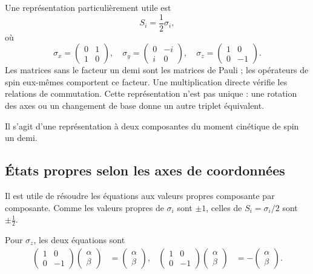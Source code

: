 Une représentation particulièrement utile est
\begin{equation}
S_i=\frac12\sigma_i,
\end{equation}
où
\begin{equation}
\sigma_x=
\begin{pmatrix}
0&1\\
1&0
\end{pmatrix},
\quad
\sigma_y=
\begin{pmatrix}
0&-i\\
i&0
\end{pmatrix},
\quad
\sigma_z=
\begin{pmatrix}
1&0\\
0&-1
\end{pmatrix}.
\end{equation}
Les matrices sans le facteur un demi sont les matrices de Pauli ; les opérateurs de spin eux-mêmes comportent ce facteur. Une multiplication directe vérifie les relations de commutation. Cette représentation n’est pas unique : une rotation des axes ou un changement de base donne un autre triplet équivalent.

Il s’agit d’une représentation à deux composantes du moment cinétique de spin un demi.

\subsection{États propres selon les axes de coordonnées}

Il est utile de résoudre les équations aux valeurs propres composante par composante. Comme les valeurs propres de \(\sigma_i\) sont \(\pm1\), celles de \(S_i=\sigma_i/2\) sont \(\pm\tfrac12\).

Pour \(\sigma_z\), les deux équations sont
\begin{align}
\begin{pmatrix}
1&0\\
0&-1
\end{pmatrix}
\begin{pmatrix}
\alpha\\
\beta
\end{pmatrix}
&=
\begin{pmatrix}
\alpha\\
\beta
\end{pmatrix},
&
\begin{pmatrix}
1&0\\
0&-1
\end{pmatrix}
\begin{pmatrix}
\alpha\\
\beta
\end{pmatrix}
&=
-
\begin{pmatrix}
\alpha\\
\beta
\end{pmatrix}.
\end{align}

